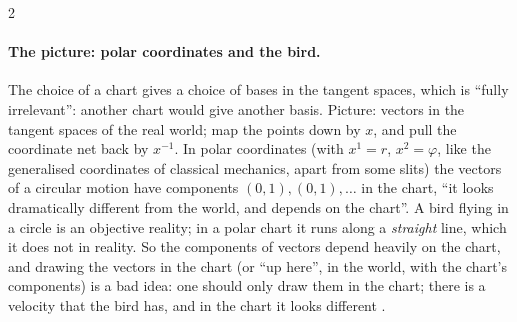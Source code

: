 \begin{paracol}{2}
\paragraph{The picture: polar coordinates and the bird.} The choice of a chart gives a choice of bases in the tangent spaces, which is ``fully irrelevant'': another chart would give another basis. Picture: vectors in the tangent spaces of the real world; map the points down by $x$, and pull the coordinate net back by $x^{-1}$.
In polar coordinates (with $x^1=r$, $x^2=\varphi$, like the generalised coordinates of classical mechanics, apart from some slits) the vectors of a circular motion have components $(0,1),(0,1),\dots$ in the chart, ``it looks dramatically different from the world, and depends on the chart''. A bird flying in a circle is an objective reality;
in a polar chart it runs along a \emph{straight} line, which it does not in reality. So the components of vectors depend heavily on the chart, and drawing the vectors in the chart (or ``up here'', in the world, with the chart's components) is a bad idea: one should only draw them in the chart; there is a velocity that the bird has, and in the chart it looks different .


\end{paracol}
